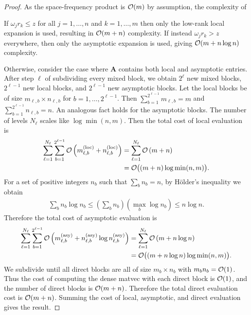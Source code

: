 \begin{proof}
    As the space-frequency product is $\mathcal{O}(m)$ by assumption, the complexity of 

    If $\omega_j r_k \leq z$ for all $j=1,\dots,n$ and $k=1,\dots,m$ then only
    the low-rank local expansion is used, resulting in $\mathcal{O}(m + n)$ complexity.
    If instead $\omega_j r_k > z$ everywhere, then only the asymptotic expansion
    is used, giving $\mathcal{O}(m + n\log n)$ complexity.

    Otherwise, consider the case where $\bm{A}$ contains both local and
    asymptotic entries. After step $\ell$ of subdividing every mixed block, we
    obtain $2^{\ell}$ new mixed blocks, $2^{\ell-1}$ new local blocks, and
    $2^{\ell-1}$ new asymptotic blocks. Let the local blocks be of size
    $m_{\ell,b} \times n_{\ell,b}$ for $b = 1,\dots,2^{\ell-1}$. Then
    $\sum_{b=1}^{2^{\ell-1}} m_{\ell,b} = m$ and $\sum_{b=1}^{2^{\ell-1}}
    n_{\ell,b} = n$. An analogous fact holds for the asymptotic blocks. The
    number of levels $N_\ell$ scales like $\log\min(n,m)$. Then the total cost
    of local evaluation is 
    \begin{align}
        \sum_{\ell=1}^{N_\ell} \sum_{b=1}^{2^{\ell-1}} \mathcal{O}\left(m_{\ell,b}^{(\text{loc})} + n_{\ell,b}^{(\text{loc})}\right)
        &= \sum_{\ell=1}^{N_\ell} \mathcal{O}\left(m + n\right) \\
        &= \mathcal{O}\big((m + n) \log \min(n,m)\big).
    \end{align}
    For a set of positive integers $n_b$ such that $\sum_b n_b = n$, by
    H\"older's inequality we obtain
    \begin{align}
        \sum_{b} n_b \log n_b 
        \leq \left( \sum_{b} n_b \right) \left(\max_b \log n_b\right)
        \leq n \log n.
    \end{align}
    Therefore the total cost of asymptotic evaluation is
    \begin{align}
        \sum_{\ell=1}^{N_\ell} \sum_{b=1}^{2^{\ell-1}} \mathcal{O}\left(m_{\ell,b}^{(\text{asy})} + n_{\ell,b}^{(\text{asy})} \log n_{\ell,b}^{(\text{asy})}\right)
        &= \sum_{\ell=1}^{N_\ell} \mathcal{O}\left(m + n \log n\right) \\
        &= \mathcal{O}\big((m + n\log n) \log \min(n,m) \big).
    \end{align}
    We subdivide until all direct blocks are all of size $m_b \times n_b$ with
    $m_bn_b = \mathcal{O}(1)$. Thus the cost of computing the dense matvec with each
    direct block is $\mathcal{O}(1)$, and the number of direct blocks is $\mathcal{O}(m + n)$.
    Therefore the total direct evaluation cost is $\mathcal{O}(m + n)$. Summing the cost
    of local, asymptotic, and direct evaluation gives the result.
\end{proof}

